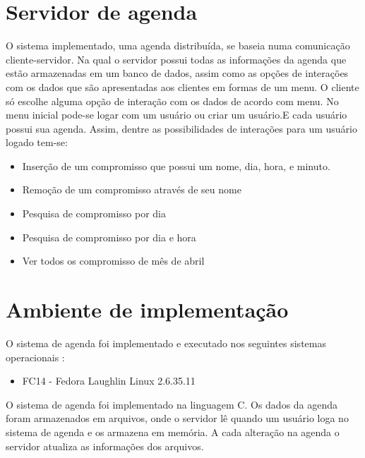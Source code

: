 \documentclass[10pt,a4paper]{article}
\begin{document}
\section{Servidor de agenda}
  O sistema implementado, uma agenda distribuída, se baseia numa comunicação
  cliente-servidor. Na qual o servidor possui todas as informações da
  agenda que estão armazenadas em um banco de dados,
  assim como as opções de interações com os dados que são apresentadas
  aos clientes em formas de um menu.
  O cliente só escolhe alguma opção de interação com os dados de
  acordo com menu.
  No menu inicial pode-se logar com um usuário ou criar um usuário.E cada
  usuário possui sua agenda. Assim, dentre as possibilidades de interações para um usuário logado tem-se:
  \begin{itemize}
  \item Inserção de um compromisso que possui um nome, dia, hora, e minuto. 
  \item Remoção de um compromisso através de seu nome
  \item Pesquisa de compromisso por dia
  \item Pesquisa de compromisso por dia e hora
  \item Ver todos os compromisso de mês de abril
  \end{itemize}
  
\section{Ambiente de implementação}
  O sistema de agenda foi implementado e executado nos seguintes sistemas operacionais :
  \begin{itemize}
  \item FC14 - Fedora Laughlin Linux 2.6.35.11
  \end{itemize}

  O sistema de agenda foi implementado na linguagem C. Os dados da
  agenda foram armazenados em arquivos, onde o servidor lê quando um
  usuário loga no sistema de agenda e os armazena em memória. 
  A cada alteração na agenda o servidor atualiza as informações dos arquivos.
\end{document}
